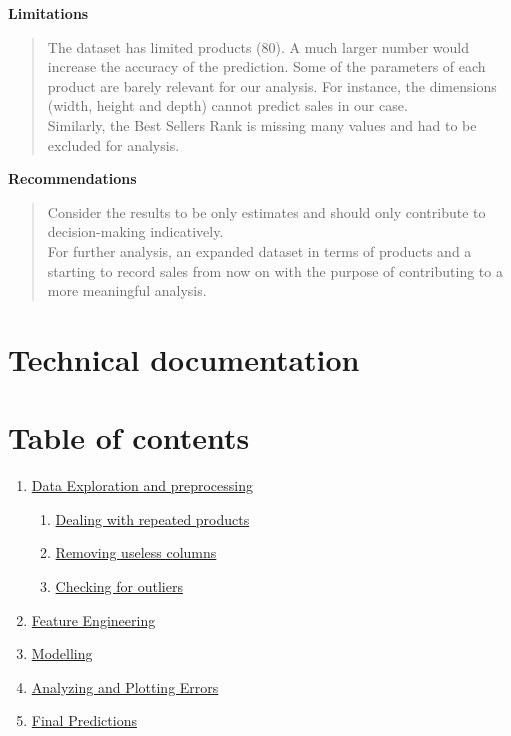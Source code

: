 \documentclass[]{article}
\providecommand{\tightlist}{%
  \setlength{\itemsep}{0pt}\setlength{\parskip}{0pt}}
\begin{document}
\textbf{Limitations}

\begin{quote}
The dataset has limited products (80). A much larger number would
increase the accuracy of the prediction. Some of the parameters of each
product are barely relevant for our analysis. For instance, the
dimensions (width, height and depth) cannot predict sales in our case.\\
Similarly, the Best Sellers Rank is missing many values and had to be
excluded for analysis.
\end{quote}

\textbf{Recommendations}

\begin{quote}
Consider the results to be only estimates and should only contribute to
decision-making indicatively.\\
For further analysis, an expanded dataset in terms of products and a
starting to record sales from now on with the purpose of contributing to
a more meaningful analysis.
\end{quote}

\hypertarget{technical-documentation}{%
\section{\texorpdfstring{\textbf{Technical
documentation}}{Technical documentation}}\label{technical-documentation}}

\hypertarget{table-of-contents}{%
\section{Table of contents}\label{table-of-contents}}

\begin{enumerate}
\def\labelenumi{\arabic{enumi}.}
\tightlist
\item
  \protect\hyperlink{Dataux5cux2520Explorationux5cux2520andux5cux2520preprocessing}{Data
  Exploration and preprocessing}

  \begin{enumerate}
  \def\labelenumii{\arabic{enumii}.}
  \tightlist
  \item
    \protect\hyperlink{Dealingux5cux2520withux5cux2520repeatedux5cux2520products}{Dealing
    with repeated products}
  \item
    \protect\hyperlink{Removingux5cux2520uselessux5cux2520columns}{Removing
    useless columns}
  \item
    \protect\hyperlink{Checkingux5cux2520forux5cux2520outliers}{Checking
    for outliers}
  \end{enumerate}
\item
  \protect\hyperlink{Featureux5cux2520Engineering}{Feature Engineering}
\item
  \protect\hyperlink{Modelling}{Modelling}
\item
  \protect\hyperlink{Analyzingux5cux2520andux5cux2520Plottingux5cux2520Errors}{Analyzing
  and Plotting Errors}
\item
  \protect\hyperlink{Finalux5cux2520Predictions}{Final Predictions}
\end{enumerate}
\end{document}
